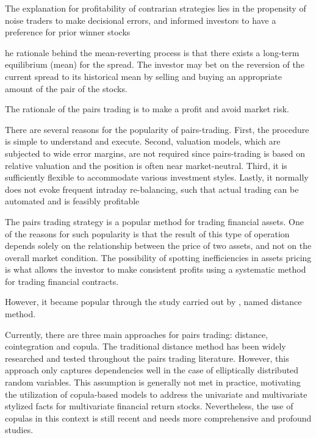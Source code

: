 The explanation for profitability of contrarian strategies lies in the propensity of noise traders to make decisional errors, and informed investors to have a preference for prior winner stocks
	
	he rationale behind the mean-reverting process is that there exists a long-term equilibrium (mean) for the spread. The investor may bet on the reversion of the current spread to its historical mean by selling and buying an appropriate amount of the pair of the stocks.
	
	The rationale of the pairs trading is to
	make a profit and avoid market risk. 
	
	There are several reasons for the popularity of pairs-trading. First, the procedure is simple to
	understand and execute. Second, valuation models, which are subjected to wide error margins, are not
	required since pairs-trading is based on relative valuation and the position is often near market-neutral.
	Third, it is sufficiently flexible to accommodate various investment styles. Lastly, it normally does not
	evoke frequent intraday re-balancing, such that actual trading can be automated and is feasibly
	profitable
	
	The pairs trading strategy is a popular method for trading financial assets. One of the reasons for such popularity is that the result of this type of operation depends solely on the relationship between the price of two assets, and not on the overall market condition. The possibility of spotting inefficiencies in assets pricing is what allows the investor to make consistent profits using a systematic method for trading financial contracts.
	
	However, it became popular through the study carried out by \citet*{ggr06}, named distance method.
	
	Currently, there are three main approaches for pairs trading: distance, cointegration and copula. The traditional distance method has been widely researched and tested throughout the pairs trading literature. However, this approach only captures dependencies well in the case of elliptically distributed random variables. This assumption is generally not met in practice, motivating the utilization of copula-based models to address the univariate and multivariate stylized facts for multivariate financial return stocks. Nevertheless, the use of copulas in this context is still recent and needs more comprehensive and profound studies.
	
